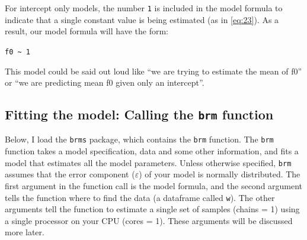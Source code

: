 \documentclass[
]{book}
\begin{document}
For intercept only models, the number \texttt{1} is included in the model formula to indicate that a single constant value is being estimated (as in \eqref{eq:23}). As a result, our model formula will have the form:

\texttt{f0\ \textasciitilde{}\ 1}

This model could be said out loud like ``we are trying to estimate the mean of f0'' or ``we are predicting mean f0 given only an intercept''.

\hypertarget{fitting-the-model-calling-the-brm-function}{%
\subsection{\texorpdfstring{Fitting the model: Calling the \texttt{brm} function}{Fitting the model: Calling the brm function}}\label{fitting-the-model-calling-the-brm-function}}

Below, I load the \texttt{brms} package, which contains the \texttt{brm} function. The \texttt{brm} function takes a model specification, data and some other information, and fits a model that estimates all the model parameters. Unless otherwise specified, \texttt{brm} assumes that the error component (\(\varepsilon\)) of your model is normally distributed. The first argument in the function call is the model formula, and the second argument tells the function where to find the data (a dataframe called \texttt{w}). The other arguments tell the function to estimate a single set of samples (chains = 1) using a single processor on your CPU (cores = 1). These arguments will be discussed more later.
\end{document}
